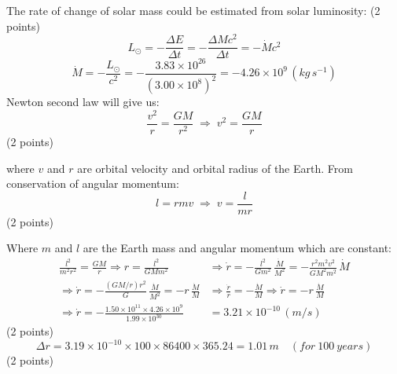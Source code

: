 The rate of change of solar mass could be estimated from solar luminosity:
\hfill(2 points)
\[
  L_\odot = -\frac{\Delta E}{\Delta t} = -\frac{\Delta M c^2}{\Delta t}
          = -\dot{M}c^2
\]
\[
  \dot{M} = -\frac{L_\odot}{c^2}
          = -\frac{3.83\times 10^{26}}{(3.00\times 10^{8})^2}
          = -4.26\times 10^{9}\,(kg\,s^{-1})
\]
Newton second law will give us:
\[
  \frac{v^2}{r} = \frac{GM}{r^2} \;\Longrightarrow\; v^2 = \frac{GM}{r}
\]
\hfill(2 points)

where $v$ and $r$ are orbital velocity and orbital radius of the Earth.
From conservation of angular momentum:
\[
  l = rmv \;\Longrightarrow\; v = \frac{l}{mr}
\]
\hfill(2 points)

Where $m$ and $l$ are the Earth mass and angular momentum which are constant:
\begin{align*}
  \frac{l^2}{m^2r^2} = \frac{GM}{r}
  \Rightarrow r = \frac{l^2}{GMm^2}
  &\Rightarrow \dot{r} = -\frac{l^2}{Gm^2}\,\frac{\dot{M}}{M^2}
   = -\frac{r^2m^2v^2}{GM^2m^2}\,\dot{M} \\
  \Rightarrow \dot{r} = -\frac{(GM/r)r^2}{G}\,\frac{\dot{M}}{M^2}
   = -r\,\frac{\dot{M}}{M}
  &\Rightarrow \frac{\dot{r}}{r} = -\frac{\dot{M}}{M}
   \Rightarrow \dot{r} = -r\,\frac{\dot{M}}{M} \\
  \Rightarrow \dot{r}
   = -\frac{1.50\times 10^{11}\times 4.26\times 10^{9}}{1.99\times 10^{30}}
  &= 3.21\times 10^{-10}\,(m/s)
\end{align*}
\hfill(2 points)
\[
  \Delta r = 3.19\times 10^{-10}\times 100\times 86400\times 365.24
  = 1.01\,m \quad (for\ 100\ years)
\]
\hfill(2 points)
